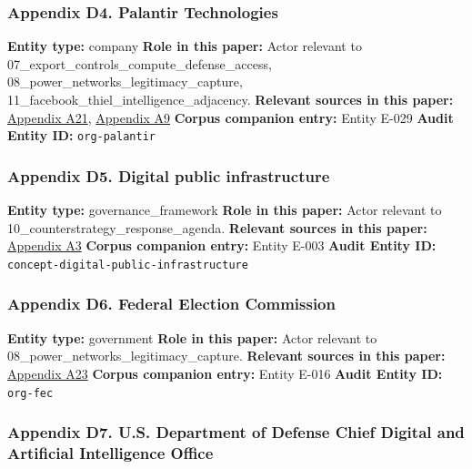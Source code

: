 \documentclass[
  american,
  11pt,
  letterpaper,
]{article}
\begin{document}
\subsubsection{Appendix D4. Palantir
Technologies}\label{ch-10-appendix-d4-palantir-technologies}

\textbf{Entity type:} company \textbf{Role in this paper:} Actor
relevant to 07\_export\_controls\_compute\_defense\_access,
08\_power\_networks\_legitimacy\_capture,
11\_facebook\_thiel\_intelligence\_adjacency. \textbf{Relevant sources
in this paper:}
\hyperref[ch-10-appendix-a21-anthropic-and-palantir-partner-to-bring-claude-ai-models-to-aws-for-u-s-government-intelligence-and-defense-operations]{Appendix
A21},
\hyperref[ch-10-appendix-a9-army-launches-detachment-201-executive-innovation-corps-to-drive-tech-transformation]{Appendix
A9} \textbf{Corpus companion entry:} Entity E-029 \textbf{Audit Entity
ID:} \texttt{org-palantir}

\subsubsection{Appendix D5. Digital public
infrastructure}\label{ch-10-appendix-d5-digital-public-infrastructure}

\textbf{Entity type:} governance\_framework \textbf{Role in this paper:}
Actor relevant to 10\_counterstrategy\_response\_agenda.
\textbf{Relevant sources in this paper:}
\hyperref[ch-10-appendix-a3-interactions-between-artificial-intelligence-and-digital-public-infrastructure-concepts-benefits-and-challenges]{Appendix
A3} \textbf{Corpus companion entry:} Entity E-003 \textbf{Audit Entity
ID:} \texttt{concept-digital-public-infrastructure}

\subsubsection{Appendix D6. Federal Election
Commission}\label{ch-10-appendix-d6-federal-election-commission}

\textbf{Entity type:} government \textbf{Role in this paper:} Actor
relevant to 08\_power\_networks\_legitimacy\_capture. \textbf{Relevant
sources in this paper:}
\hyperref[ch-10-appendix-a23-leading-the-future-committee-overview]{Appendix
A23} \textbf{Corpus companion entry:} Entity E-016 \textbf{Audit Entity
ID:} \texttt{org-fec}

\subsubsection{Appendix D7. U.S. Department of Defense Chief Digital and
Artificial Intelligence
Office}\label{ch-10-appendix-d7-u-s-department-of-defense-chief-digital-and-artificial-intelligence-office}
\end{document}
